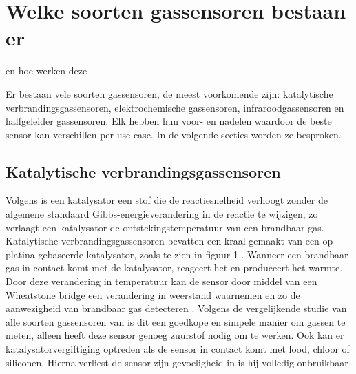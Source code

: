 \section{Welke soorten gassensoren bestaan er}%
\label{sec:soorten-gassensoren}
en hoe werken deze

Er bestaan vele soorten gassensoren, de meest voorkomende zijn: katalytische verbrandingsgassensoren, elektrochemische gassensoren, infraroodgassensoren en halfgeleider gassensoren. Elk hebben hun voor- en nadelen waardoor de beste sensor kan verschillen per use-case. In de volgende secties worden ze besproken.

\subsection{Katalytische verbrandingsgassensoren}
\label{subsec:katalytische}

Volgens 
is een katalysator een stof die de reactiesnelheid verhoogt zonder de algemene standaard Gibbs-energieverandering in de reactie te wijzigen, zo verlaagt een katalysator de ontstekingstemperatuur van een brandbaar gas. Katalytische verbrandingsgassensoren bevatten een kraal gemaakt van een op platina gebaseerde katalysator, zoals te zien in figuur 1
. Wanneer een brandbaar gas in contact komt met de katalysator, reageert het en produceert het warmte. Door deze verandering in temperatuur kan de sensor door middel van een Wheatstone bridge een verandering in weerstand waarnemen en zo de aanwezigheid van brandbaar gas detecteren
. Volgens de vergelijkende studie van alle soorten gassensoren van
is dit een goedkope en simpele manier om gassen te meten, alleen heeft deze sensor genoeg zuurstof nodig om te werken. Ook kan er katalysatorvergiftiging optreden als de sensor in contact komt met lood, chloor of siliconen. Hierna verliest de sensor zijn gevoeligheid in is hij volledig onbruikbaar


